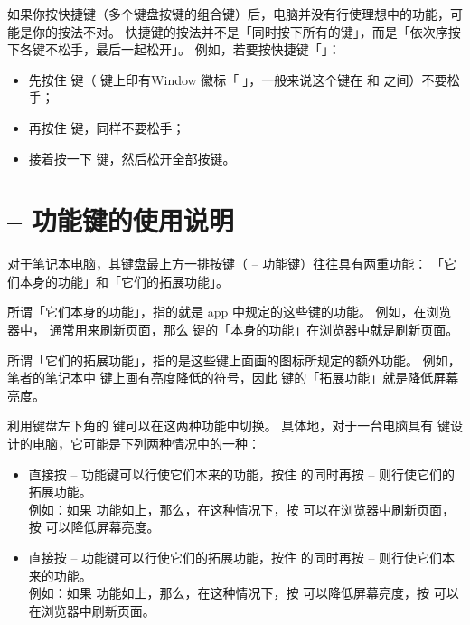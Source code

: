 如果你按快捷键（多个键盘按键的组合键）后，电脑并没有行使理想中的功能，可能是你的按法不对。
快捷键的按法并不是「同时按下所有的键」，而是「依次序按下各键不松手，最后一起松开」。
例如，若要按快捷键「」：

\begin{itemize}
  \item 先按住  键（ 键上印有Window 徽标「」，一般来说这个键在  和  之间）不要松手；
  \item 再按住  键，同样不要松手；
  \item 接着按一下  键，然后松开全部按键。
\end{itemize}

\section{ --  功能键的使用说明}

对于笔记本电脑，其键盘最上方一排按键（ --  功能键）往往具有两重功能：
「它们本身的功能」和「它们的拓展功能」。

所谓「它们本身的功能」，指的就是 app 中规定的这些键的功能。
例如，在浏览器中， 通常用来刷新页面，那么  键的「本身的功能」在浏览器中就是刷新页面。

所谓「它们的拓展功能」，指的是这些键上面画的图标所规定的额外功能。
例如，笔者的笔记本中  键上画有亮度降低的符号，因此  键的「拓展功能」就是降低屏幕亮度。

利用键盘左下角的  键可以在这两种功能中切换。
具体地，对于一台电脑具有  键设计的电脑，它可能是下列两种情况中的一种：

\begin{itemize}
  \item 直接按  --  功能键可以行使它们本来的功能，按住  的同时再按  --  则行使它们的拓展功能。\\
    例如：如果  功能如上，那么，在这种情况下，按  可以在浏览器中刷新页面，按  可以降低屏幕亮度。
  \item 直接按  --  功能键可以行使它们的拓展功能，按住  的同时再按  --  则行使它们本来的功能。\\
    例如：如果  功能如上，那么，在这种情况下，按  可以降低屏幕亮度，按  可以在浏览器中刷新页面。
\end{itemize}

